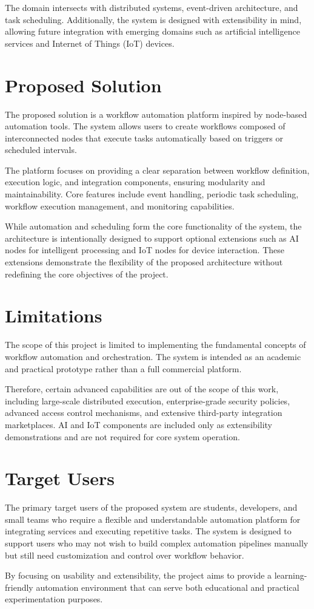 The domain intersects with distributed systems, event-driven architecture, and task scheduling. Additionally, the system is designed with extensibility in mind, allowing future integration with emerging domains such as artificial intelligence services and Internet of Things (IoT) devices.

\section{Proposed Solution}
The proposed solution is a workflow automation platform inspired by node-based automation tools. The system allows users to create workflows composed of interconnected nodes that execute tasks automatically based on triggers or scheduled intervals.

The platform focuses on providing a clear separation between workflow definition, execution logic, and integration components, ensuring modularity and maintainability. Core features include event handling, periodic task scheduling, workflow execution management, and monitoring capabilities.

While automation and scheduling form the core functionality of the system, the architecture is intentionally designed to support optional extensions such as AI nodes for intelligent processing and IoT nodes for device interaction. These extensions demonstrate the flexibility of the proposed architecture without redefining the core objectives of the project.

\section{Limitations}
The scope of this project is limited to implementing the fundamental concepts of workflow automation and orchestration. The system is intended as an academic and practical prototype rather than a full commercial platform.

Therefore, certain advanced capabilities are out of the scope of this work, including large-scale distributed execution, enterprise-grade security policies, advanced access control mechanisms, and extensive third-party integration marketplaces. AI and IoT components are included only as extensibility demonstrations and are not required for core system operation.

\section{Target Users}
The primary target users of the proposed system are students, developers, and small teams who require a flexible and understandable automation platform for integrating services and executing repetitive tasks. The system is designed to support users who may not wish to build complex automation pipelines manually but still need customization and control over workflow behavior.

By focusing on usability and extensibility, the project aims to provide a learning-friendly automation environment that can serve both educational and practical experimentation purposes.
